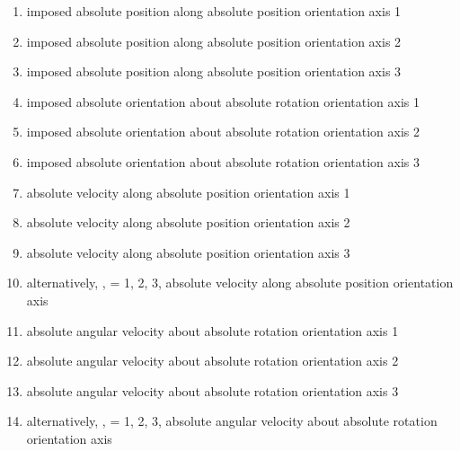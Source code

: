 \begin{enumerate}
\item {} imposed absolute position along absolute position orientation axis 1
\item {} imposed absolute position along absolute position orientation axis 2
\item {} imposed absolute position along absolute position orientation axis 3

\item {} imposed absolute orientation about absolute rotation orientation axis 1
\item {} imposed absolute orientation about absolute rotation orientation axis 2
\item {} imposed absolute orientation about absolute rotation orientation axis 3

\item {} absolute velocity along absolute position orientation axis 1
\item {} absolute velocity along absolute position orientation axis 2
\item {} absolute velocity along absolute position orientation axis 3

\item[-] alternatively, ,  = 1, 2, 3, absolute velocity along absolute position orientation axis 

\item {} absolute angular velocity about absolute rotation orientation axis 1
\item {} absolute angular velocity about absolute rotation orientation axis 2
\item {} absolute angular velocity about absolute rotation orientation axis 3

\item[-] alternatively, ,  = 1, 2, 3, absolute angular velocity about absolute rotation orientation axis 
\end{enumerate}

